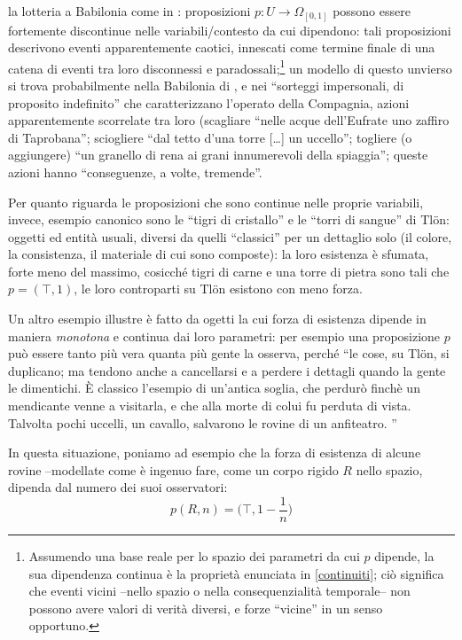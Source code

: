 \begin{example}\label{bli}
  la lotteria a Babilonia come in \cite{babil}: proposizioni $p : U \to \Omega_{[0,1]}$ possono essere fortemente discontinue nelle variabili/contesto da cui dipendono: tali proposizioni descrivono eventi apparentemente caotici, innescati come termine finale di una catena di eventi tra loro disconnessi e paradossali;\footnote{Assumendo una base reale per lo spazio dei parametri da cui $p$ dipende, la sua dipendenza continua è la proprietà enunciata in \ref{continuiti}; ciò significa che eventi vicini --nello spazio o nella consequenzialità temporale-- non possono avere valori di verità diversi, e forze ``vicine'' in un senso opportuno.} un modello di questo unvierso si trova probabilmente nella Babilonia di \cite{babil}, e nei ``sorteggi impersonali, di proposito indefinito'' che caratterizzano l'operato della Compagnia, azioni apparentemente scorrelate tra loro (scagliare ``nelle acque dell'Eufrate uno zaffiro di Taprobana''; sciogliere ``dal tetto d'una torre [\dots\unkern] un uccello''; togliere (o aggiungere) ``un granello di rena ai grani innumerevoli della spiaggia''; queste azioni hanno ``conseguenze, a volte, tremende''.
\end{example}
\begin{example}\label{blu}
  Per quanto riguarda le proposizioni che sono continue nelle proprie variabili, invece, esempio canonico sono le ``tigri di cristallo'' e le ``torri di sangue'' di Tl\"{o}n: oggetti ed entità usuali, diversi da quelli ``classici'' per un dettaglio solo (il colore, la consistenza, il materiale di cui sono composte): la loro esistenza è sfumata, forte meno del massimo, cosicché tigri di carne e una torre di pietra sono tali che $p=(\top,1)$, le loro controparti su Tl\"on esistono con meno forza. 
  
  Un altro esempio illustre è fatto da ogetti la cui forza di esistenza dipende in maniera \emph{monotona} e continua dai loro parametri: per esempio una proposizione $p$ può essere tanto più vera quanta più gente la osserva, perché ``le cose, su Tlön, si duplicano; ma tendono anche a cancellarsi e a  perdere i dettagli quando la gente le dimentichi. È classico l'esempio di  un'antica soglia, che perdurò finchè un mendicante venne a visitarla, e che alla  morte di colui fu perduta di vista. Talvolta pochi uccelli, un cavallo, salvarono le  rovine di un anfiteatro. ''

  In questa situazione, poniamo ad esempio che la forza di esistenza di alcune rovine --modellate come è ingenuo fare, come un corpo rigido $R$ nello spazio, dipenda dal numero dei suoi osservatori:
        \[\textstyle p(R, n) = \big(\top, 1-\frac{1}{n}\big)\]
\end{example}
